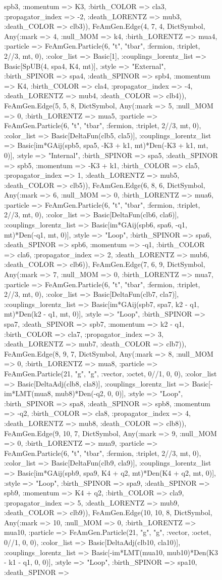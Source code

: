 \documentclass{revtex4}
\begin{document}
\begin{figure}[!htb]
\begin{center}
{spb3, :momentum => K3, :birth_COLOR => cla3, :propagator_index => -2, :death_LORENTZ => mub3, :death_COLOR => clb3)), FeAmGen.Edge(4, 7, 4, Dict{Symbol, Any}(:mark => 4, :null_MOM => k4, :birth_LORENTZ => mua4, :particle => FeAmGen.Particle(6, "t", "tbar", :fermion, :triplet, 2//3, mt, 0), :color_list => Basic[1], :couplings_lorentz_list => Basic[SpUB(4, spa4, K4, mt)], :style => "External", :birth_SPINOR => spa4, :death_SPINOR => spb4, :momentum => K4, :birth_COLOR => cla4, :propagator_index => -4, :death_LORENTZ => mub4, :death_COLOR => clb4)), FeAmGen.Edge(5, 5, 8, Dict{Symbol, Any}(:mark => 5, :null_MOM => 0, :birth_LORENTZ => mua5, :particle => FeAmGen.Particle(6, "t", "tbar", :fermion, :triplet, 2//3, mt, 0), :color_list => Basic[DeltaFun(clb5, cla5)], :couplings_lorentz_list => Basic[im*GAij(spb5, spa5, -K3 + k1, mt)*Den(-K3 + k1, mt, 0)], :style => "Internal", :birth_SPINOR => spa5, :death_SPINOR => spb5, :momentum => -K3 + k1, :birth_COLOR => cla5, :propagator_index => 1, :death_LORENTZ => mub5, :death_COLOR => clb5)), FeAmGen.Edge(6, 8, 6, Dict{Symbol, Any}(:mark => 6, :null_MOM => 0, :birth_LORENTZ => mua6, :particle => FeAmGen.Particle(6, "t", "tbar", :fermion, :triplet, 2//3, mt, 0), :color_list => Basic[DeltaFun(clb6, cla6)], :couplings_lorentz_list => Basic[im*GAij(spb6, spa6, -q1, mt)*Den(-q1, mt, 0)], :style => "Loop", :birth_SPINOR => spa6, :death_SPINOR => spb6, :momentum => -q1, :birth_COLOR => cla6, :propagator_index => 2, :death_LORENTZ => mub6, :death_COLOR => clb6)), FeAmGen.Edge(7, 6, 9, Dict{Symbol, Any}(:mark => 7, :null_MOM => 0, :birth_LORENTZ => mua7, :particle => FeAmGen.Particle(6, "t", "tbar", :fermion, :triplet, 2//3, mt, 0), :color_list => Basic[DeltaFun(clb7, cla7)], :couplings_lorentz_list => Basic[im*GAij(spb7, spa7, k2 - q1, mt)*Den(k2 - q1, mt, 0)], :style => "Loop", :birth_SPINOR => spa7, :death_SPINOR => spb7, :momentum => k2 - q1, :birth_COLOR => cla7, :propagator_index => 3, :death_LORENTZ => mub7, :death_COLOR => clb7)), FeAmGen.Edge(8, 9, 7, Dict{Symbol, Any}(:mark => 8, :null_MOM => 0, :birth_LORENTZ => mua8, :particle => FeAmGen.Particle(21, "g", "g", :vector, :octet, 0//1, 0, 0), :color_list => Basic[DeltaAdj(clb8, cla8)], :couplings_lorentz_list => Basic[-im*LMT(mua8, mub8)*Den(-q2, 0, 0)], :style => "Loop", :birth_SPINOR => spa8, :death_SPINOR => spb8, :momentum => -q2, :birth_COLOR => cla8, :propagator_index => 4, :death_LORENTZ => mub8, :death_COLOR => clb8)), FeAmGen.Edge(9, 10, 7, Dict{Symbol, Any}(:mark => 9, :null_MOM => 0, :birth_LORENTZ => mua9, :particle => FeAmGen.Particle(6, "t", "tbar", :fermion, :triplet, 2//3, mt, 0), :color_list => Basic[DeltaFun(clb9, cla9)], :couplings_lorentz_list => Basic[im*GAij(spb9, spa9, K4 + q2, mt)*Den(K4 + q2, mt, 0)], :style => "Loop", :birth_SPINOR => spa9, :death_SPINOR => spb9, :momentum => K4 + q2, :birth_COLOR => cla9, :propagator_index => 5, :death_LORENTZ => mub9, :death_COLOR => clb9)), FeAmGen.Edge(10, 10, 8, Dict{Symbol, Any}(:mark => 10, :null_MOM => 0, :birth_LORENTZ => mua10, :particle => FeAmGen.Particle(21, "g", "g", :vector, :octet, 0//1, 0, 0), :color_list => Basic[DeltaAdj(clb10, cla10)], :couplings_lorentz_list => Basic[-im*LMT(mua10, mub10)*Den(K3 - k1 - q1, 0, 0)], :style => "Loop", :birth_SPINOR => spa10, :death_SPINOR => }
\end{center}
\end{figure}
\end{document}
